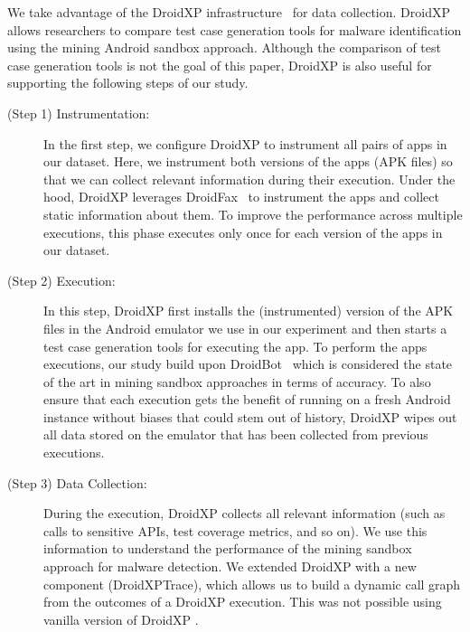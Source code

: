 We take advantage of the DroidXP infrastructure~\cite{DBLP:conf/scam/CostaMCMVBC20}
for data collection. DroidXP allows researchers to compare 
test case generation tools for malware identification using the
mining Android sandbox approach. Although the comparison of test
case generation tools is not the goal of this paper, DroidXP
is also useful for supporting the following steps of our study.

\begin{description}
 \item[(Step 1) Instrumentation:] In the first step,
we configure DroidXP to instrument all pairs of apps in our dataset.
Here, we instrument both versions of the apps (APK files) so that
we can collect relevant information during their execution. Under the hood, DroidXP leverages
DroidFax~\cite{DBLP:conf/icsm/CaiR17a} to instrument the apps and collect static
information about them. To improve the performance across multiple executions,
this phase executes only once for each version of the apps in our dataset.

\item[(Step 2) Execution:] In this step, DroidXP first installs the (instrumented) version of the APK files in the
  Android emulator we use in our experiment and then starts a test case generation tools for executing the app. To perform the apps executions, our study build upon DroidBot~\cite{DBLP:conf/icse/LiYGC17} which is considered the state of the art in mining sandbox approaches in terms of accuracy. To also ensure
  that each execution gets the benefit of running on a fresh Android instance without biases that could stem out of history,
  DroidXP wipes out all data stored on the emulator that has been collected from previous executions.

\item[(Step 3) Data Collection:] During the execution, DroidXP collects all relevant information (such as calls to sensitive APIs,
  test coverage metrics, and so on). We use this information to understand the performance of the mining sandbox approach for
  malware detection. We extended DroidXP with a new component (DroidXPTrace), which allows us to build a dynamic call graph from the outcomes of a DroidXP execution. This was not possible using vanilla version of DroidXP .
\end{description}

